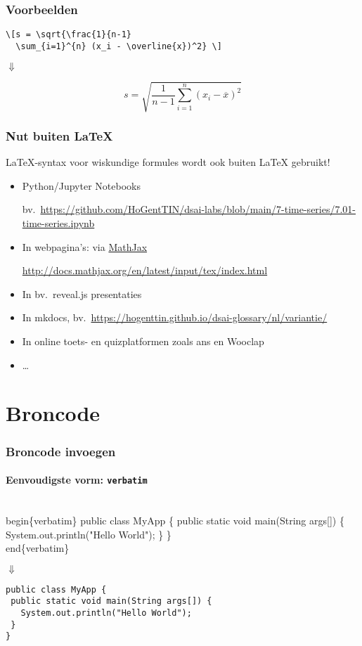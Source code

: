 \documentclass[aspectratio=169]{beamer}
\begin{document}
\begin{frame}[fragile]
  \frametitle{Voorbeelden}

  \begin{verbatim}
\[s = \sqrt{\frac{1}{n-1} 
  \sum_{i=1}^{n} (x_i - \overline{x})^2} \]
\end{verbatim}

  \bigskip

  \centering
  $\Downarrow$

  \bigskip

  \[s = \sqrt{\frac{1}{n-1} \sum_{i=1}^{n} (x_i - \overline{x})^2} \]

\end{frame}

\begin{frame}
  \frametitle{Nut buiten {\LaTeX}}

  {\LaTeX}-syntax voor wiskundige formules wordt ook buiten {\LaTeX} gebruikt!

  \begin{itemize}
    \item Python/Jupyter Notebooks

          bv.\ \url{https://github.com/HoGentTIN/dsai-labs/blob/main/7-time-series/7.01-time-series.ipynb}

    \item In webpagina's: via \href{https://www.mathjax.org}{MathJax}

          \url{http://docs.mathjax.org/en/latest/input/tex/index.html}

    \item In bv.~reveal.js presentaties
    \item In mkdocs, bv.~\url{https://hogenttin.github.io/dsai-glossary/nl/variantie/}
    \item In online toets- en quizplatformen zoals ans en Wooclap
    \item \ldots
  \end{itemize}

\end{frame}

\section{Broncode}

\begin{frame}[fragile]
  \frametitle{Broncode invoegen}
  \framesubtitle{Eenvoudigste vorm: \texttt{verbatim}}

\begin{semiverbatim}
\alert{\\begin\{verbatim\}}
public class MyApp \{
  public static void main(String args[]) \{
    System.out.println("Hello World");
  \}
\}
\alert{\\end\{verbatim\}}
\end{semiverbatim}

  \centering
  $\Downarrow$

\begin{verbatim}
public class MyApp {
 public static void main(String args[]) {
   System.out.println("Hello World");
 }
}
\end{verbatim}

\end{frame}
\end{document}

